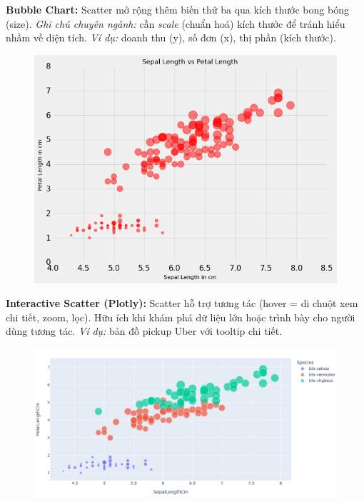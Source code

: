 \documentclass[11pt]{article}
\begin{document}
\medskip
\textbf{Bubble Chart:} Scatter mở rộng thêm biến thứ ba qua kích thước bong bóng (size).
\textit{Ghi chú chuyên ngành:} cần \emph{scale} (chuẩn hoá) kích thước để tránh hiểu nhầm về diện tích.
\textit{Ví dụ:} doanh thu (y), số đơn (x), thị phần (kích thước).
\begin{figure}[H]
    \centering
    \includegraphics[width=0.5\linewidth]{images/BubbleP.png}
\end{figure}

\medskip
\textbf{Interactive Scatter (Plotly):} Scatter hỗ trợ tương tác (hover = di chuột xem chi tiết, zoom, lọc). Hữu ích khi khám phá dữ liệu lớn hoặc trình bày cho người dùng tương tác.
\textit{Ví dụ:} bản đồ pickup Uber với tooltip chi tiết.
\begin{figure}[H]
    \centering
    \includegraphics[width=0.6\linewidth]{images/PlottyScatter.png}
\end{figure}
\end{document}
